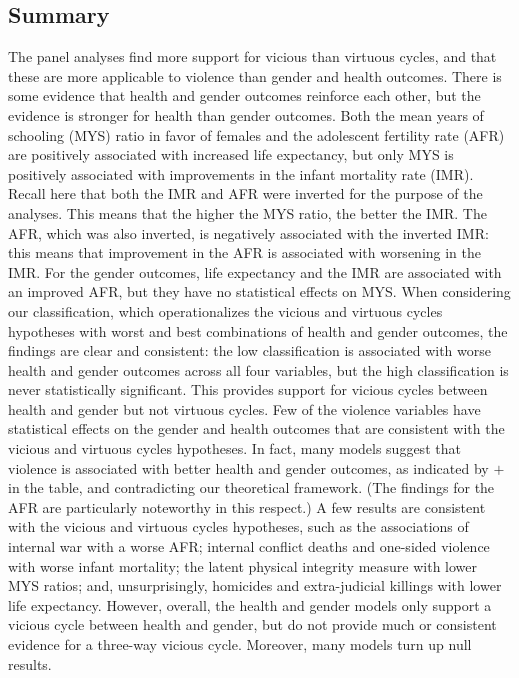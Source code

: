 \documentclass[12pt]{article}
\begin{document}
\subsection{Summary}

The panel analyses find more support for vicious than virtuous cycles, and that these are more applicable to violence than gender and health outcomes.
There is some evidence that health and gender outcomes reinforce each other, but the evidence is stronger for health than gender outcomes. Both the mean years of schooling (MYS) ratio in favor of females and the adolescent fertility rate (AFR) are positively associated with increased life expectancy, but only MYS is positively associated with improvements in the infant mortality rate (IMR). Recall here that both the IMR and AFR were inverted for the purpose of the analyses. This means that the higher the MYS ratio, the better the IMR. The AFR, which was also inverted, is negatively associated with the inverted IMR: this means that improvement in the AFR is associated with worsening in the IMR. For the gender outcomes, life expectancy and the IMR are associated with an improved AFR, but they have no statistical effects on MYS. When considering our classification, which operationalizes the vicious and virtuous cycles hypotheses with worst and best combinations of health and gender outcomes, the findings are clear and consistent: the low classification is associated with worse health and gender outcomes across all four variables, but the high classification is never statistically significant. This provides support for vicious cycles between health and gender but not virtuous cycles.
Few of the violence variables have statistical effects on the gender and health outcomes that are  consistent with the vicious and virtuous cycles hypotheses. In fact, many models suggest that violence is associated with better health and gender outcomes, as indicated by   $+$ in the table, and contradicting our theoretical framework. (The findings for the AFR are particularly noteworthy in this respect.) A few results are consistent with the vicious and virtuous cycles hypotheses, such as the associations of internal war with a worse AFR; internal conflict deaths and one-sided violence with worse infant mortality; the latent physical integrity measure with lower MYS ratios; and, unsurprisingly, homicides and extra-judicial killings with lower life expectancy. However, overall, the health and gender models only support a vicious cycle between health and gender, but do not provide much or consistent evidence for a three-way vicious cycle. Moreover, many models turn up null results.
\end{document}
